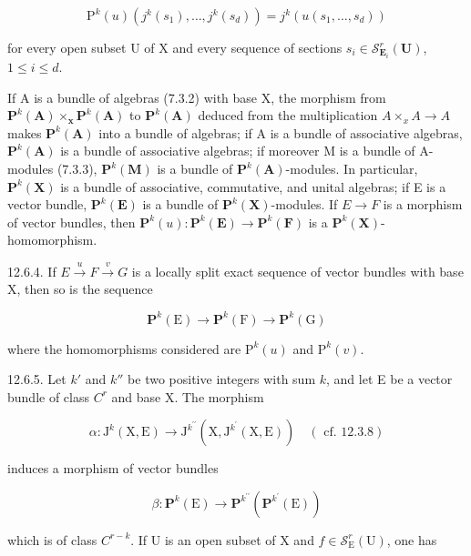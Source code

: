 \[
\mathrm{P} ^ {k} (u) \left(j ^ {k} \left(s _ {1}\right), \dots , j ^ {k} \left(s _ {d}\right)\right) = j ^ {k} \left(u \left(s _ {1}, \dots , s _ {d}\right)\right)
\]

for every open subset U of X and every sequence of sections \(s_i \in \mathcal{S}_{\mathbf{E}_i}^r(\mathbf{U})\), \(1 \leqslant i \leqslant d\).

If A is a bundle of algebras (7.3.2) with base X, the morphism from \(\mathbf{P}^{k}(\mathbf{A}) \times_{\mathbf{x}} \mathbf{P}^{k}(\mathbf{A})\) to \(\mathbf{P}^{k}(\mathbf{A})\) deduced from the multiplication \(A \times_{x} A \to A\) makes \(\mathbf{P}^{k}(\mathbf{A})\) into a bundle of algebras; if A is a bundle of associative algebras, \(\mathbf{P}^{k}(\mathbf{A})\) is a bundle of associative algebras; if moreover M is a bundle of A-modules (7.3.3), \(\mathbf{P}^{k}(\mathbf{M})\) is a bundle of \(\mathbf{P}^{k}(\mathbf{A})\)-modules. In particular, \(\mathbf{P}^{k}(\mathbf{X})\) is a bundle of associative, commutative, and unital algebras; if E is a vector bundle, \(\mathbf{P}^{k}(\mathbf{E})\) is a bundle of \(\mathbf{P}^{k}(\mathbf{X})\)-modules. If \(E \to F\) is a morphism of vector bundles, then \(\mathbf{P}^{k}(u): \mathbf{P}^{k}(\mathbf{E}) \to \mathbf{P}^{k}(\mathbf{F})\) is a \(\mathbf{P}^{k}(\mathbf{X})\)-homomorphism.

12.6.4. If \(E \xrightarrow{u} F \xrightarrow{v} G\) is a locally split exact sequence of vector bundles with base X, then so is the sequence

\[
\mathbf {P} ^ {k} (\mathrm{E}) \rightarrow \mathbf {P} ^ {k} (\mathrm{F}) \rightarrow \mathbf {P} ^ {k} (\mathrm{G})
\]

where the homomorphisms considered are \(\mathrm{P}^{k}(u)\) and \(\mathrm{P}^{k}(v)\).

12.6.5. Let \(k'\) and \(k''\) be two positive integers with sum \(k\), and let E be a vector bundle of class \(C^{r}\) and base X. The morphism

\[
\alpha \colon \mathrm{J} ^ {k} (\mathrm{X}, \mathrm{E}) \rightarrow \mathrm{J} ^ {k ^ {\prime \prime}} (\mathrm{X}, \mathrm{J} ^ {k ^ {\prime}} (\mathrm{X}, \mathrm{E})) \quad (\text { cf. } 1 2. 3. 8)
\]

induces a morphism of vector bundles

\[
\beta \colon \mathbf {P} ^ {k} (\mathrm{E}) \rightarrow \mathbf {P} ^ {k ^ {\prime \prime}} (\mathbf {P} ^ {k ^ {\prime}} (\mathrm{E}))
\]

which is of class \(C^{r-k}\). If U is an open subset of X and \(f\in\mathcal{S}_{\mathrm{E}}^{r}(\mathrm{U})\), one has

